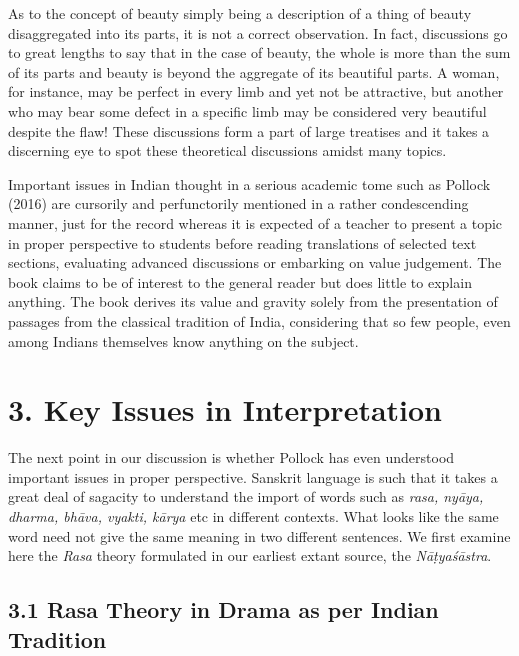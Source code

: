 As to the concept of beauty simply being a description of a thing of beauty disaggregated into its parts, it is not a correct observation. In fact, discussions go to great lengths to say that in the case of beauty, the whole is more than the sum of its parts and beauty is beyond the aggregate of its beautiful parts. A woman, for instance, may be perfect in every limb and yet not be attractive, but another who may bear some defect in a specific limb may be considered very beautiful despite the flaw! These discussions form a part of large treatises and it takes a discerning eye to spot these theoretical discussions amidst many topics.

Important issues in Indian thought in a serious academic tome such as Pollock (2016) are cursorily and perfunctorily mentioned in a rather condescending manner, just for the record whereas it is expected of a teacher to present a topic in proper perspective to students before reading translations of selected text sections, evaluating advanced discussions or embarking on value judgement. The book claims to be of interest to the general reader but does little to explain anything. The book derives its value and gravity solely from the presentation of passages from the classical tradition of India, considering that so few people, even among Indians themselves know anything on the subject.


\section*{3. Key Issues in Interpretation}

The next point in our discussion is whether Pollock has even understood important issues in proper perspective. Sanskrit language is such that it takes a great deal of sagacity to understand the import of words such as \textit{rasa, nyāya, dharma, bhāva, vyakti, kārya} etc in different contexts. What looks like the same word need not give the same meaning in two different sentences. We first examine here the \textit{Rasa} theory formulated in our earliest extant source, the \textit{Nāṭyaśāstra}.

\subsection*{3.1 Rasa Theory in Drama as per Indian Tradition}

